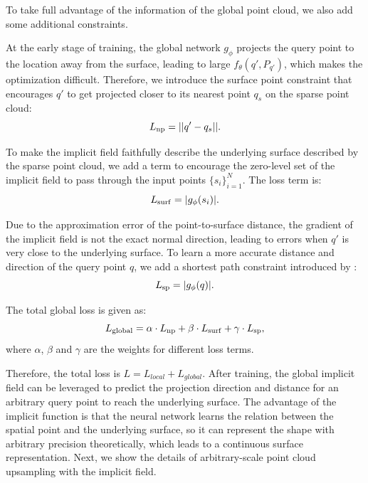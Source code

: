 \documentclass[letterpaper]{article} %
\begin{document}
To take full advantage of the information of the global point cloud, we also add some additional constraints. 

At the early stage of training, the global network $g_{\phi}$ projects the query point to the location away from the surface, leading to large $f_{\theta}(q', P_{q'})$, which makes the optimization difficult. Therefore, we introduce the surface point constraint that encourages $q'$ to get projected closer to its nearest point $q_s$ on the sparse point cloud:
\begin{equation}
\label{eq:np_loss}
L_{\rm{np}} = ||q'-q_s||.
\end{equation}

To make the implicit field faithfully describe the underlying surface described by the sparse point cloud, we add a term to encourage the zero-level set of the implicit field to pass through the input points $\{s_i\}_{i=1}^N$. The loss term is:
\begin{equation}
\label{eq:np_surf}
L_{\rm{surf}} = |g_\phi(s_i)|.
\end{equation}

Due to the approximation error of the point-to-surface distance, the gradient of the implicit field is not the exact normal direction, leading to errors when $q'$ is very close to the underlying surface. To learn a more accurate distance and direction of the query point $q$, we add a shortest path constraint introduced by \cite{ma2022reconstructing}:
\begin{equation}
\label{eq:sp_loss}
L_{\rm{sp}} = |g_\phi(q)|.
\end{equation}

The total global loss is given as:
\begin{equation}
\label{eq:global_loss}
L_{\rm{global}} = \alpha \cdot L_{\rm{np}} + \beta \cdot L_{\rm{surf}} + \gamma \cdot L_{\rm{sp}},
\end{equation}
where $\alpha$, $\beta$ and $\gamma$ are the weights for different loss terms.

Therefore, the total loss is $L=L_{local}+L_{global}$. After training, the global implicit field can be leveraged to predict the projection direction and distance for an arbitrary query point to reach the underlying surface. The advantage of the implicit function is that the neural network learns the relation between the spatial point and the underlying surface, so it can represent the shape with arbitrary precision theoretically, which leads to a continuous surface representation. Next, we show the details of arbitrary-scale point cloud upsampling with the implicit field.
\end{document}
